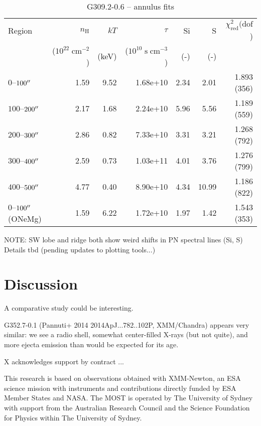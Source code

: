 \documentclass[preprint2,tighten,trackchanges]{aastex6}
\newcommand*{\mt}{\mathrm}
\newcommand*{\unit}[1]{\;\mt{#1}}  %
\begin{document}
\begin{table*}
    \centering
    \caption{G309.2-0.6 -- annulus fits}
    \begin{tabular}{@{}lrrrrrr@{}}
        \toprule
        Region & $n_\mathrm{H}$             & $kT$  & $\tau$                        & Si  & S   & $\chi^2_{\mathrm{red}} (\mathrm{dof}$) \\
               & ($10^{22} \unit{cm^{-2}}$) & (keV) & ($10^{10} \unit{s\;cm^{-3}}$) & (-) & (-) &  \\
        \midrule
        $0$--$100\mbox{$^{\prime\prime}$}$ & 1.59 & 9.52 & 1.68e+10 & 2.34 & 2.01 & 1.893 (356) \\  %
        $100$--$200\mbox{$^{\prime\prime}$}$ & 2.17 & 1.68 & 2.24e+10 & 5.96 & 5.56 & 1.189 (559) \\  %
        $200$--$300\mbox{$^{\prime\prime}$}$ & 2.86 & 0.82 & 7.33e+10 & 3.31 & 3.21 & 1.268 (792) \\  %
        $300$--$400\mbox{$^{\prime\prime}$}$ & 2.59 & 0.73 & 1.03e+11 & 4.01 & 3.76 & 1.276 (799) \\  %
        $400$--$500\mbox{$^{\prime\prime}$}$ & 4.77 & 0.40 & 8.90e+10 & 4.34 & 10.99 & 1.186 (822) \\  %
        \midrule
        $0$--$100\mbox{$^{\prime\prime}$}$ (ONeMg) & 1.59 & 6.22 & 1.72e+10 & 1.97 & 1.42 & 1.543 (353) \\  %
        \bottomrule
    \end{tabular}
\end{table*}


NOTE: SW lobe and ridge both show weird shifts in PN spectral lines (Si, S)
Details tbd (pending updates to plotting tools...)


\section{Discussion}

A comparative study could be interesting.

G352.7-0.1 (Pannuti+ 2014 2014ApJ...782..102P, XMM/Chandra) appears very
similar: we see a radio shell, somewhat center-filled X-rays (but not quite),
and more ejecta emission than would be expected for its age.


\acknowledgments

X acknowledges support by contract ...

This research is based on observations obtained with XMM-Newton, an ESA science
mission with instruments and contributions directly funded by ESA Member States
and NASA.
The MOST is operated by The University of Sydney with support from the
Australian Research Council and the Science Foundation for Physics within The
University of Sydney.
\end{document}
